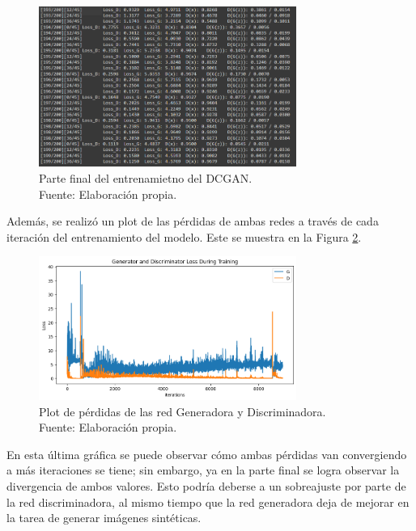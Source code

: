 \begin{figure}[H]
	\begin{center}
		\includegraphics[width=0.75\textwidth]{4/figures/dcgan_1_train.PNG}
		\caption[Parte final del entrenamietno del DCGAN]{Parte final del entrenamietno del DCGAN. \\
		Fuente: Elaboración propia.}
		\label{4:fig113}
	\end{center}
\end{figure}

Además, se realizó un plot de las pérdidas de ambas redes a través de cada iteración del entrenamiento del modelo. Este se muestra en la Figura \ref{4:fig114}.

\begin{figure}[H]
	\begin{center}
		\includegraphics[width=0.75\textwidth]{4/figures/plot_loss_1.png}
		\caption[Plot de pérdidas de las red Generadora y Discriminadora]{Plot de pérdidas de las red Generadora y Discriminadora. \\
		Fuente: Elaboración propia.}
		\label{4:fig114}
	\end{center}
\end{figure}

En esta última gráfica se puede observar cómo ambas pérdidas van convergiendo a más iteraciones se tiene; sin embargo, ya en la parte final se logra observar la divergencia de ambos valores. Esto podría deberse a un sobreajuste por parte de la red discriminadora, al mismo tiempo que la red generadora deja de mejorar en la tarea de generar imágenes sintéticas.

